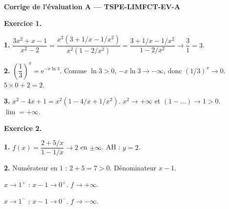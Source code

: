 %
%
%

\textbf{Corrige de l'évaluation A — TSPE-LIMFCT-EV-A}

\bigskip


\textbf{Exercice 1.}

\textbf{1.} $\dfrac{3x^2+x-1}{x^2-2} = \dfrac{x^2(3+1/x-1/x^2)}{x^2(1-2/x^2)} = \dfrac{3+1/x-1/x^2}{1-2/x^2} \to \dfrac{3}{1} = \boxed{3}$.

\textbf{2.} $\left(\dfrac{1}{3}\right)^x = \mathrm{e}^{-x\ln 3}$. Comme $\ln 3 > 0$, $-x\ln 3 \to -\infty$, donc $(1/3)^x \to 0$. $5 \times 0 + 2 = \boxed{2}$.

\textbf{3.} $x^2 - 4x + 1 = x^2(1 - 4/x + 1/x^2)$. $x^2 \to +\infty$ et $(1 - \ldots) \to 1 > 0$. $\boxed{\lim = +\infty}$.

\bigskip


\textbf{Exercice 2.}

\textbf{1.} $f(x) = \dfrac{2+5/x}{1-1/x} \to 2$ en $\pm\infty$. AH : $y = 2$.

\textbf{2.} Numérateur en $1$ : $2+5 = 7 > 0$. Dénominateur $x-1$.

$x \to 1^+$ : $x-1 \to 0^+$. $f \to \boxed{+\infty}$.

$x \to 1^-$ : $x-1 \to 0^-$. $f \to \boxed{-\infty}$.

